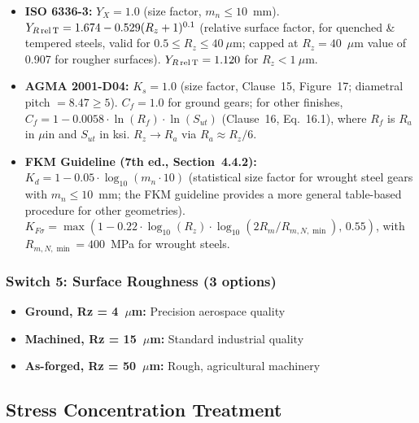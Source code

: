 \documentclass[12pt,a4paper]{article}
\begin{document}
\begin{itemize}
  \item \textbf{ISO 6336-3:} $Y_X = 1.0$ (size factor, $m_n \leq 10$~mm).
        $Y_{R\,\rm rel\,T} = 1.674 - 0.529(R_z+1)^{0.1}$ (relative
        surface factor, for quenched \& tempered steels, valid for
        $0.5 \leq R_z \leq 40~\mu$m; capped at $R_z=40$~$\mu$m value
        of 0.907 for rougher surfaces). $Y_{R\,\rm rel\,T} = 1.120$
        for $R_z < 1~\mu$m.
  \item \textbf{AGMA 2001-D04:} $K_s = 1.0$ (size factor, Clause~15,
        Figure~17; diametral pitch $=8.47 \geq 5$).
        $C_f = 1.0$ for ground gears; for other finishes,
        $C_f = 1 - 0.0058 \cdot \ln(R_f) \cdot \ln(S_{ut})$
        (Clause~16, Eq.~16.1), where $R_f$ is $R_a$ in $\mu$in
        and $S_{ut}$ in ksi. $R_z \rightarrow R_a$ via
        $R_a \approx R_z/6$.
  \item \textbf{FKM Guideline (7th ed., Section~4.4.2):}
        $K_d = 1 - 0.05 \cdot \log_{10}(m_n \cdot 10)$ (statistical size
        factor for wrought steel gears with $m_n \leq 10$~mm;
        the FKM guideline provides a more general table-based procedure
        for other geometries).
        $K_{F\sigma} = \max(1 - 0.22 \cdot \log_{10}(R_z) \cdot
        \log_{10}(2R_m/R_{m,N,\min}),\, 0.55)$, with
        $R_{m,N,\min}=400$~MPa for wrought steels.
\end{itemize}

\subsubsection{Switch 5: Surface Roughness (3 options)}

\begin{itemize}
  \item \textbf{Ground, Rz = 4~$\mu$m:} Precision aerospace quality
  \item \textbf{Machined, Rz = 15~$\mu$m:} Standard industrial quality
  \item \textbf{As-forged, Rz = 50~$\mu$m:} Rough, agricultural machinery
\end{itemize}

\subsection{Stress Concentration Treatment}
\end{document}
